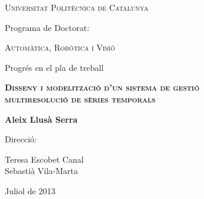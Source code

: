 \begin{titlepage}
  \begin{center} 

   

    {\Large \scshape Universitat Politècnica de Catalunya} \vskip 1cm 

    {Programa de Doctorat:} \vskip 0.5cm 
    
    {\scshape Automàtica, Robòtica i Visió} \vfill%

    {Progrés en el pla de treball} \vskip 1cm 
    
    {\scshape \bfseries \Large Disseny i modelització d'un sistema de gestió\\
       multiresolució de sèries temporals} \vskip 2cm

    {\bfseries Aleix Llusà Serra} \vfill%

    {Direcció:}
       
    {Teresa Escobet Canal \\
    Sebastià Vila-Marta}  \vskip 1cm 


    {Juliol de 2013}

\end{center}
\end{titlepage}





  






